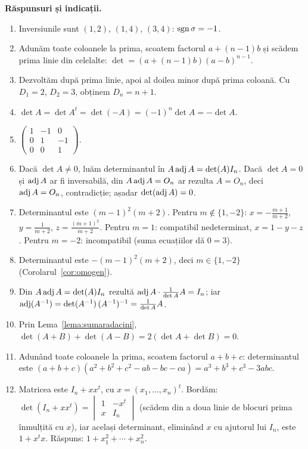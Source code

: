 \medskip\noindent\textbf{Răspunsuri și indicații.}
\begin{enumerate}[label=\textbf{\arabic*.},leftmargin=*]
\item Inversiunile sunt $(1,2)$, $(1,4)$, $(3,4)$: $\operatorname{sgn}\sigma=-1$.
\item Adunăm toate coloanele la prima, scoatem factorul $a+(n-1)b$ și scădem prima linie din celelalte: $\det=(a+(n-1)b)(a-b)^{n-1}$.
\item Dezvoltăm după prima linie, apoi al doilea minor după prima coloană. Cu $D_1=2$, $D_2=3$, obținem $D_n=n+1$.
\item $\det A=\det A^t=\det(-A)=(-1)^n\det A=-\det A$.
\item $\begin{pmatrix}1&-1&0\\0&1&-1\\0&0&1\end{pmatrix}$.
\item Dacă $\det A\neq0$, luăm determinantul în $A\operatorname{adj} A=\det(A)I_n$. Dacă $\det A=0$ și $\operatorname{adj} A$ ar fi inversabilă, din $A\operatorname{adj} A=O_n$ ar rezulta $A=O_n$, deci $\operatorname{adj} A=O_n$, contradicție; așadar $\det(\operatorname{adj} A)=0$.
\item Determinantul este $(m-1)^2(m+2)$. Pentru $m\notin\{1,-2\}$: $x=-\frac{m+1}{m+2}$, $y=\frac1{m+2}$, $z=\frac{(m+1)^2}{m+2}$. Pentru $m=1$: compatibil nedeterminat, $x=1-y-z$. Pentru $m=-2$: incompatibil (suma ecuațiilor dă $0=3$).
\item Determinantul este $-(m-1)^2(m+2)$, deci $m\in\{1,-2\}$ (Corolarul~\ref{cor:omogen}).
\item Din $A\operatorname{adj} A=\det(A)I_n$ rezultă $\operatorname{adj} A\cdot\frac1{\det A}A=I_n$; iar $\operatorname{adj}(A^{-1})=\det(A^{-1})\,(A^{-1})^{-1}=\frac1{\det A}A$.
\item Prin Lema~\ref{lema:sumaradacini}, $\det(A+B)+\det(A-B)=2(\det A+\det B)=0$.
\item Adunând toate coloanele la prima, scoatem factorul $a+b+c$: determinantul este $(a+b+c)(a^2+b^2+c^2-ab-bc-ca)=a^3+b^3+c^3-3abc$.
\item Matricea este $I_n+xx^t$, cu $x=(x_1,\dots,x_n)^t$. Bordăm: $\det(I_n+xx^t)=\begin{vmatrix}1&-x^t\\x&I_n\end{vmatrix}$ (scădem din a doua linie de blocuri prima înmulțită cu $x$), iar același determinant, eliminând $x$ cu ajutorul lui $I_n$, este $1+x^tx$. Răspuns: $1+x_1^2+\cdots+x_n^2$.
\end{enumerate}

